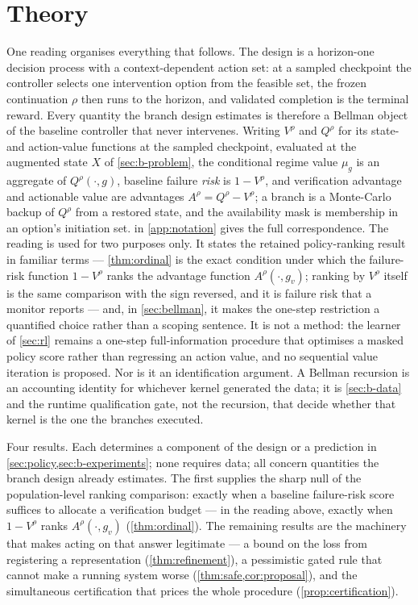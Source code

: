 \section{Theory}
\label{sec:theory}

One reading organises everything that follows.  The design is a horizon-one
decision process with a context-dependent action set: at a sampled checkpoint
the controller selects one intervention option from the feasible set, the frozen
continuation $\rho$ then runs to the horizon, and validated completion is the
terminal reward.  Every quantity the branch design estimates is therefore a
Bellman object of the baseline controller that never intervenes.  Writing
$V^\rho$ and $Q^\rho$ for its state- and action-value functions at the sampled
checkpoint, evaluated at the augmented state $X$ of \cref{sec:b-problem}, the
conditional regime value $\mu_g$ is an aggregate of $Q^\rho(\cdot,g)$, baseline
failure \emph{risk} is $1-V^\rho$, and verification advantage and actionable
value are advantages $A^\rho=Q^\rho-V^\rho$; a branch is a Monte-Carlo backup of
$Q^\rho$ from a restored state, and the availability mask is membership in an
option's initiation set.   in \cref{app:notation}
gives the full correspondence.  The reading is used for two purposes only.  It
states the retained policy-ranking result in familiar terms --- \cref{thm:ordinal} is the exact
condition under which the failure-risk function $1-V^\rho$ ranks the advantage
function $A^\rho(\cdot,g_v)$; ranking by $V^\rho$ itself is the same comparison
with the sign reversed, and it is failure risk that a monitor reports --- and,
in \cref{sec:bellman}, it makes the one-step restriction a quantified choice
rather than a scoping sentence.  It is not a method: the learner of
\cref{sec:rl} remains a one-step full-information procedure that optimises a
masked policy score rather than regressing an action value, and no sequential
value iteration is proposed.  Nor is it an identification argument.  A Bellman
recursion is an accounting identity for whichever kernel generated the data; it
is \cref{sec:b-data} and the runtime qualification gate, not the recursion, that decide
whether that kernel is the one the branches executed.

Four results.  Each determines a component of the design or a prediction in
\cref{sec:policy,sec:b-experiments}; none requires data; all concern quantities the
branch design already estimates.  The first supplies the sharp null of the
population-level ranking comparison: exactly when a baseline failure-risk score suffices to
allocate a verification budget --- in the reading above, exactly when $1-V^\rho$ ranks
$A^\rho(\cdot,g_v)$ (\cref{thm:ordinal}).  The remaining results are the machinery that makes
acting on that answer legitimate --- a bound on the loss from registering a
representation (\cref{thm:refinement}), a pessimistic gated rule that cannot
make a running system worse (\cref{thm:safe,cor:proposal}), and the simultaneous
certification that prices the whole procedure (\cref{prop:certification}).

